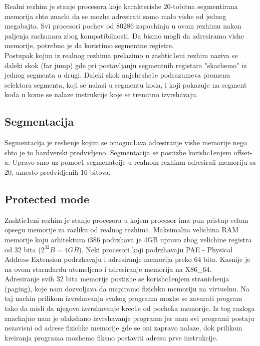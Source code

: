\documentclass[a4paper,fleqn,12pt]{JMThesis}
\newcommand\eng{\fontencoding{OT1}\fontfamily{\rmdefault}\selectfont}
\begin{document}
Realni rezhim je stanje procesora koje karakterishe 20-tobitna segmentirana
memorija shto znachi da se mozhe adresirati samo malo vishe od jednog
megabajta. Svi procesori pochev od 80286 zapochinju u ovom rezhimu nakon
paljenja rachunara zbog kompatibilnosti. Da bismo mogli da adresiramo vishe
memorije, potrebno je da koristimo segmentne registre.\\

Postupak kojim iz realnog rezhima prelazimo u zashtic1eni rezhim naziva se
daleki skok {\eng (far jump)} gde pri postavljanju segmentnih registara
"skachemo" iz jednog segmenta u drugi. Daleki skok najchesh\/c1e podrazumeva
promenu selektora segmenta, koji se nalazi u segmentu koda, i koji pokazuje na
segment koda u kome se nalaze instrukcije koje se trenutno izvrshavaju.

\subsection{Segmentacija}
\smallskip

Segmentacija je reshenje kojim se omoguc1ava adresiranje vishe memorije nego
shto je to hardverski predvidjeno. Segmentacija se postizhe korish\/c1enjem
{\eng offset}-a. Upravo smo uz pomoc1 segmenatcije u realnom rezhimu adresirali
memoriju sa 20, umesto predvidjenih 16 bitova.

\subsection{{\eng Protected mode}}
\smallskip

Zashtic1eni rezhim je stanje procesora u kojem procesor ima pun pristup celom
opsegu memorije za razliku od realnog rezhima. Maksimalna velichina {\eng RAM}
memorije koju arhitektura {\eng i386} podrzhava je {\eng 4GB} upravo zbog
velichine registra od 32 bita ($2^{32}B = 4GB$). Neki procesori koji
podrzhavaju {\eng PAE - Physical Address Extension} podrzhavaju i adresiranje
memorija preko 64 bita. Kasnije je na ovom starndardu utemeljeno i adresiranje
memorija na {\eng X86\_64}.\\

Adresiranje svih 32 bita memorije postizhe se korish\/c1enjem stranichenja
({\eng paging}), koje nam dozvoljava da mapiramo fizichku memoriju na
virtuelnu. Na taj nachin prilikom izvrshavanja svakog programa mozhe se
zavarati program tako da misli da njegovo izvrshavanje krec1e od pocheka
memorije. Iz tog razloga znachajno nam je olakshano izvrshavanje programa jer
nam svi programi postaju nezavisni od adrese fizichke memorije gde se oni
zapravo nalaze, dok prilikom kreiranja programa mozhemo fiksno postaviti adresu
prve instrukcije.\\
\end{document}
